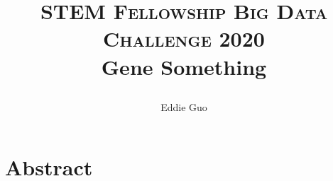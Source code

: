 \documentclass{article}
\title{
		\usefont{OT1}{bch}{b}{n}
		\normalfont \normalsize \textsc{STEM Fellowship Big Data Challenge 2020} \\ [10pt]
        \huge Gene Something
        \author{Eddie Guo}
}
\begin{document}
\maketitle

\section{Abstract}
\end{document}
